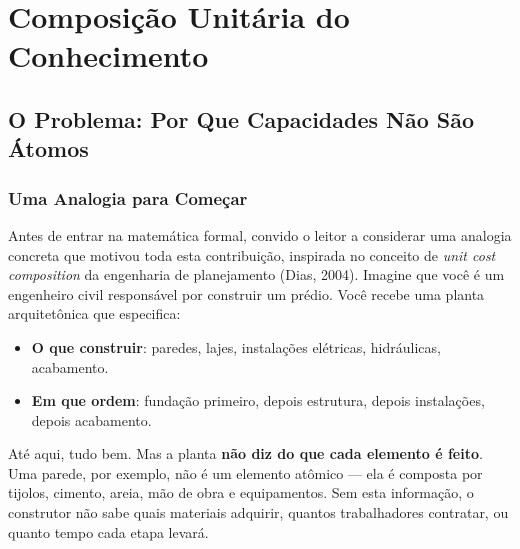 \chapter{Composição Unitária do Conhecimento}
\label{ch:composicao}

\section{O Problema: Por Que Capacidades Não São Átomos}

\subsection{Uma Analogia para Começar}

Antes de entrar na matemática formal, convido o leitor a considerar uma analogia concreta que motivou toda esta contribuição, inspirada no conceito de \textit{unit cost composition} da engenharia de planejamento (Dias, 2004). Imagine que você é um engenheiro civil responsável por construir um prédio. Você recebe uma planta arquitetônica que especifica:

\begin{itemize}
    \item \textbf{O que construir}: paredes, lajes, instalações elétricas, hidráulicas, acabamento.
    \item \textbf{Em que ordem}: fundação primeiro, depois estrutura, depois instalações, depois acabamento.
\end{itemize}

Até aqui, tudo bem. Mas a planta \textbf{não diz do que cada elemento é feito}. Uma parede, por exemplo, não é um elemento atômico — ela é composta por tijolos, cimento, areia, mão de obra e equipamentos. Sem esta informação, o construtor não sabe quais materiais adquirir, quantos trabalhadores contratar, ou quanto tempo cada etapa levará.

